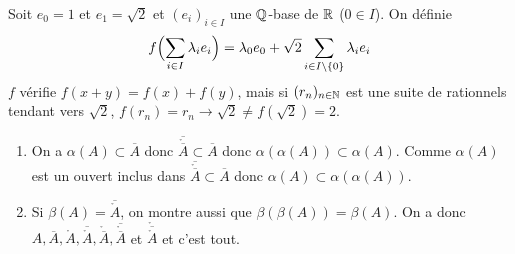 \begin{remark}
	Soit $e_{0}=1$ et $e_{1}=\sqrt{2}$ et $(e_{i})_{i\in I}$ une $\mathbb{Q}$-base de $\mathbb{R}$ ($0\in I$). On définie 
	$$f\Bigl(\sum_{i\in I}\lambda_{i} e_{i}\Bigr)=\lambda_{0}e_{0}+\sqrt{2}\sum_{i\in I\setminus\{0\}}\lambda_{i}e_{i}$$
	$f$ vérifie $f(x+y)=f(x)+f(y)$, mais si $(r_{n})_{n\in\mathbb{N}}$ est une suite de rationnels tendant vers $\sqrt{2}$, $f(r_{n})=r_{n}\to\sqrt{2}\neq f(\sqrt{2})=2$.
\end{remark}

\begin{solution}
	\phantom{}
	\begin{enumerate}
		\item On a $\alpha(A)\subset \overline{A}$ donc $\overline{\mathring{\overline{A}}}\subset\overline{A}$ donc $\alpha(\alpha(A))\subset\alpha(A)$. Comme $\alpha(A)$ est un ouvert inclus dans $\overline{\mathring{\overline{A}}}\subset\overline{A}$ donc $\alpha(A)\subset\alpha(\alpha(A))$.

		\item Si $\beta(A)=\overline{\mathring{A}}$, on montre aussi que $\beta(\beta(A))=\beta(A)$. On a donc $A,\overline{A},\mathring{A},\overline{\mathring{A}},\mathring{\overline{A}},\overline{\mathring{\overline{A}}}$ et $\mathring{\overline{\mathring{A}}}$ et c'est tout.
	\end{enumerate}
\end{solution}

